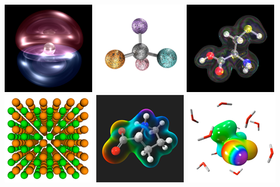 \documentclass[a4paper,12pt]{article}
\begin{document}
\begin{center}
\includegraphics[scale=0.58]{figures/gallery/g23_sm.png}\
\includegraphics[scale=0.58]{figures/gallery/g26_sm.png}
\includegraphics[scale=0.58]{figures/gallery/g24_sm.png} \\
\includegraphics[scale=0.58]{figures/gallery/g7_sm.png}\
\includegraphics[scale=0.58]{figures/gallery/g5_sm.png}\
\includegraphics[scale=0.58]{figures/gallery/g3_sm.png}\

\end{center}
\end{document}
